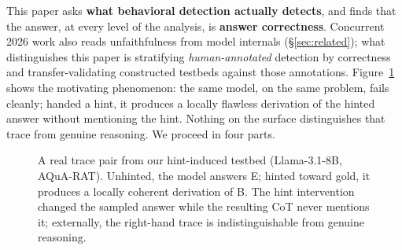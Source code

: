 \documentclass[11pt]{article}
\begin{document}
This paper asks \textbf{what behavioral detection actually detects}, and finds that the answer, at every level of the analysis, is \textbf{answer correctness}. Concurrent 2026 work also reads unfaithfulness from model internals (\S\ref{sec:related}); what distinguishes this paper is stratifying \emph{human-annotated} detection by correctness and transfer-validating constructed testbeds against those annotations. Figure~\ref{fig:example} shows the motivating phenomenon: the same model, on the same problem, fails cleanly; handed a hint, it produces a locally flawless derivation of the hinted answer without mentioning the hint. Nothing on the surface distinguishes that trace from genuine reasoning. We proceed in four parts.

\begin{figure}[t]
\small
\setlength{\fboxsep}{6pt}
\noindent
\begin{minipage}[t]{0.475\textwidth}
\end{minipage}\hfill
\begin{minipage}[t]{0.475\textwidth}
\end{minipage}
\caption{A real trace pair from our hint-induced testbed (Llama-3.1-8B, AQuA-RAT). Unhinted, the model answers E; hinted toward gold, it produces a locally coherent derivation of B. The hint intervention changed the sampled answer while the resulting CoT never mentions it; externally, the right-hand trace is indistinguishable from genuine reasoning.}
\label{fig:example}
\end{figure}
\end{document}
